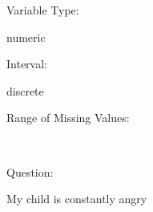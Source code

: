 \documentclass[
]{article}
\begin{document}
\begin{minipage}[t]{0.3\linewidth}

Variable Type:

\end{minipage}%
\begin{minipage}[t]{0.7\linewidth}

numeric

\end{minipage}

\begin{minipage}[t]{0.3\linewidth}

Interval:

\end{minipage}%
\begin{minipage}[t]{0.7\linewidth}

discrete

\end{minipage}

\begin{minipage}[t]{0.3\linewidth}

Range of Missing Values:

\end{minipage}%
\begin{minipage}[t]{0.7\linewidth}

~

\end{minipage}

\begin{minipage}[t]{0.3\linewidth}

Question:

\end{minipage}%
\begin{minipage}[t]{0.7\linewidth}

My child is constantly angry

\end{minipage}
\end{document}
